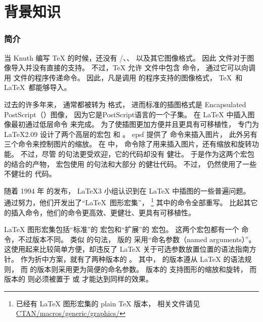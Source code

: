 \part{背景知识}

\section{简介}\label{sec:introduction}
当 Knuth 编写 \TeX{} 的时候，还没有 /、、 以及其它图像格式。
因此  文件对于图像导入并没有直接的支持。
不过，\TeX{} 允许 文件中包含  命令，
通过它可以向调用  文件的程序传递命令。
因此，凡是调用  的程序支持的图像格式，
\TeX\ 和 \LaTeX\ 都能够导入。

过去的许多年来， 通常都被转为 格式，
进而标准的插图格式是 Encapsulated PostScript（）图像，
因为它是PostScript语言的一个子集。
在 \LaTeX{} 中插入图像最初通过低层命令  来完成。
为了使插图更加方便并且更具有可移植性，
专门为 \LaTeX 2.09 设计了两个高层的宏包  和 。
\textsf{epsf} 提供了  命令来插入图片，
此外另有三个命令来控制图片的缩放。
在  中， 命令除了用来插入图片，还有缩放和旋转功能。
不过，尽管  的句法更受欢迎，它的代码却没有  健壮。
于是作为这两个宏包的结合的产物，
 宏包使用  的句法和大部分  的健壮代码。
不过， 仍然使用了一些不健壮的  代码。

随着 1994 年 \LaTeXe{} 的发布，
\LaTeX 3 小组认识到在 \LaTeX{} 中插图的一些普遍问题。
通过努力，他们开发出了“\LaTeX\ 图形宏集”，
\footnote{已经有 \LaTeX{} 图形宏集的 plain \TeX{} 版本，
	相关文件请见 \href{ftp://ctan.tug.org/tex-archive/macros/plain/graphics/}{CTAN/macros/generic/graphics/}}
其中的命令全部重写。
比起其它的插入命令，他们的命令更高效、更健壮、更具有可移植性。

\LaTeX{} 图形宏集包括“标准”的  宏包和“扩展”的  宏包。
这两个宏包都有一个  命令，不过版本不同。
类似  的句法，
 版的  采用“命名参数（named arguments）”。
这使用起来比较简单方便，却违反了 \LaTeX{} 关于可选参数放置位置的语法指南方针。
作为折中方案，就有了两种版本的 。
其中， 的版本遵从 \LaTeX{} 的语法规则，
而 的版本则采用更为简便的命名参数。
 版本的  支持图形的缩放和旋转，
而  版本的  则必须被置于  或  才能达到同样的效果。


